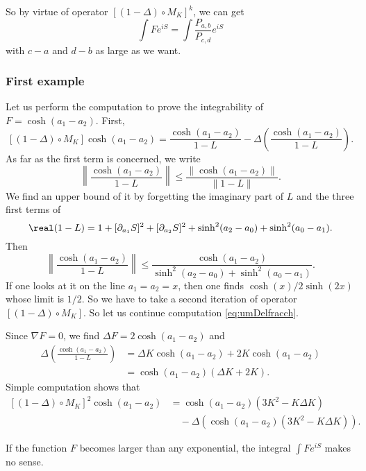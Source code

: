 So by virtue of operator $[(1-\Delta)\circ M_K]^k$, we can get
\begin{equation}
\int F  e^{iS}=\int \frac{P_{a,b}}{P_{c,d}} e^{iS}
\end{equation}
with $c-a$ and $d-b$ as large as we want.

\subsubsection{First example}

Let us perform the computation to prove the integrability of $F=\cosh(a_1-a_2)$. First,
\begin{equation}  \label{eq:umDelfracch}
  [(1-\Delta)\circ M_K]\cosh(a_1-a_2)=\frac{\cosh(a_1-a_2)}{1-L}-\Delta\left( \frac{\cosh(a_1-a_2)}{1-L} \right).
\end{equation}
As far as the first term is concerned, we write
\[ 
  \left\|  \frac{\cosh(a_1-a_2)}{1-L}  \right\|\leq \frac{\| \cosh(a_1-a_2) \|}{\| 1-L \|}.
\]
We find an upper bound of it by forgetting the imaginary part of $L$ and the three first terms of
\[ 
  \real(1-L)=1+[\partial_{a_1}S]^2+[\partial_{a_2}S]^2+\sinh^2(a_2-a_0)+\sinh^2(a_0-a_1).
\]
Then
\[ 
  \left\| \frac{\cosh(a_1-a_2)}{1-L}\right\|\leq \frac{\cosh(a_1-a_2)}{\sinh^2(a_2-a_0)+\sinh^2(a_0-a_1)}.
\]
If one looks at it on the line $a_1=a_2=x$, then one finds $\cosh(x)/2\sinh(2x)$ whose limit is $1/2$. So we have to take a second iteration of operator $[(1-\Delta)\circ M_K]$. So let us continue computation \eqref{eq:umDelfracch}. 

Since $\nabla F=0$, we find $\Delta F=2\cosh(a_1-a_2)$ and
\begin{equation}
\begin{split}
\Delta\left( \frac{\cosh(a_1-a_2)}{1-L} \right)&=\Delta K \cosh(a_1-a_2)+2K\cosh(a_1-a_2)\\
                                               &=\cosh(a_1-a_2)(\Delta K+2K).
\end{split}
\end{equation}
Simple computation shows that 
\begin{equation}
\begin{split}
[(1-\Delta)\circ M_K]^2\cosh(a_1-a_2)&=\cosh(a_1-a_2)(3K^2-K\Delta K)\\
		&\quad-\Delta(\cosh(a_1-a_2)(3K^2-K\Delta K)).
\end{split}
\end{equation}

\begin{lemma}
If the function $F$ becomes larger than any exponential, the integral $\int F e^{iS}$ makes no sense.
\end{lemma}

